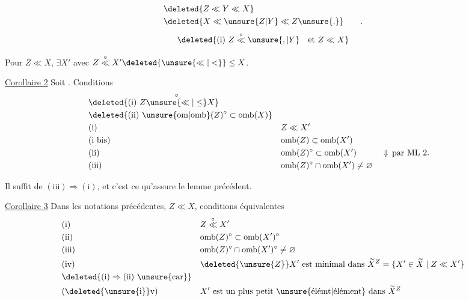 
\[
\begin{aligned}
&\deleted{Z\ll Y\ll X}\\
&\deleted{X\ll\unsure{Z|Y}\ll Z\unsure{.}}\qquad .
\end{aligned}
\]
\[
\deleted{\text{(i) }Z\overset{\circ}{\ll}\unsure{,|Y}\quad\text{et }Z\ll X}
\]

 Pour $Z\ll X$, $\exists X'$ avec $Z\overset{\circ}{\ll}X'\deleted{\unsure{\ll|<}}\leq X$.

\uline{Corollaire 2} Soit
. Conditions 
\[
\begin{aligned}
&\deleted{\text{(i) }Z\overset{\circ}{\unsure{\ll|\leq}}X}\\
&\deleted{\text{(ii) }\unsure{\mathrm{om}|\mathrm{omb}}(Z)^\circ\subset\mathrm{omb}(X)}\\
&\text{(i)} && Z\ll X'\\
&\text{(i bis)} && \mathrm{omb}(Z)\subset\mathrm{omb}(X')\\
&\text{(ii)} && \mathrm{omb}(Z)^\circ\subset\mathrm{omb}(X') && \Downarrow\,\text{par ML 2.}\\
&\text{(iii)} && \mathrm{omb}(Z)^\circ\cap\mathrm{omb}(X')\neq\varnothing
\end{aligned}
\]

Il suffit de  $(\mathrm{iii})\Longrightarrow(\mathrm{i})$, et c'est ce qu'assure le lemme précédent.

\uline{Corollaire 3} Dans les notations précédentes, $Z\ll X$, conditions équivalentes
\[
\begin{aligned}
&\text{(i)} && Z\overset{\circ}{\ll}X'\\
&\text{(ii)} && \mathrm{omb}(Z)^\circ\subset\mathrm{omb}(X')^\circ\\
&\text{(iii)} && \mathrm{omb}(Z)^\circ\cap\mathrm{omb}(X')^\circ\neq\varnothing\\
&\text{(iv)} && \deleted{\unsure{Z}}X'\ \text{est minimal dans }\widetilde X^{Z}=\{X'\in\widetilde X\mid Z\ll X'\}\\
&\deleted{\mathrm{(i)}\Rightarrow\mathrm{(ii)}\ \text{\unsure{car}}}\\
&\text{(\deleted{\unsure{i}}v)} && X'\ \text{est un plus petit \unsure{élémt|élément} dans }\widetilde X^{Z}
\end{aligned}
\]

